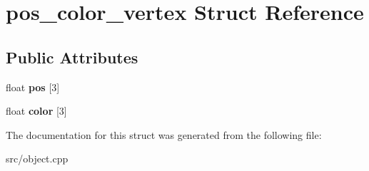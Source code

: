 \hypertarget{structpos__color__vertex}{}\section{pos\+\_\+color\+\_\+vertex Struct Reference}
\label{structpos__color__vertex}
\subsection*{Public Attributes}
\begin{DoxyCompactItemize}
\item 
\mbox{\label{structpos__color__vertex_a3fe1392c96e92389560c8f1b07bf56fe}} 
float {\bfseries pos} \mbox{[}3\mbox{]}
\item 
\mbox{\label{structpos__color__vertex_af66a8b148a74fdaeea34da46baaa1009}} 
float {\bfseries color} \mbox{[}3\mbox{]}
\end{DoxyCompactItemize}


The documentation for this struct was generated from the following file\+:\begin{DoxyCompactItemize}
\item 
src/object.\+cpp\end{DoxyCompactItemize}
